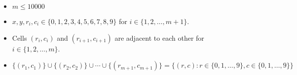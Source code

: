 \begin{itemize}
\tightlist
\item $m\le 10000$
\item $x,y,r_i,c_i\in\{0,1,2,3,4,5,6,7,8,9\}$ for $i\in\{1,2,\ldots,m+1\}$. 
\item Cells $(r_i,c_i)$ and $(r_{i+1},c_{i+1})$ are adjacent to each other 
      for $i\in\{1,2,\ldots,m\}$.
\item $\{(r_1,c_1)\}\cup\{(r_2,c_2)\}\cup\cdots\cup\{(r_{m+1},c_{m+1})\}=\{(r,c):r\in\{0,1,\dots,9\},c\in\{0,1,\dots,9\}\}$
\end{itemize}
